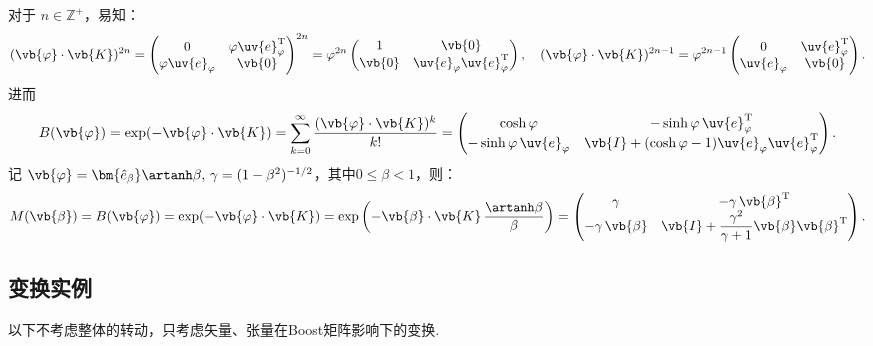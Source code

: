 对于 \(n \in \mathbb{Z}^+\)，易知：
\begin{equation*}
	(\vb{\varphi} \cdot \vb{K})^{2n} = \begin{pmatrix}
		0                      & \varphi \uv{e}_\varphi^\mathrm{T} \\
		\varphi \uv{e}_\varphi & \vb{0}
	\end{pmatrix}^{2n} = \varphi^{2n} \begin{pmatrix}
		1      & \vb{0}                                   \\
		\vb{0} & \uv{e}_\varphi \uv{e}_\varphi^\mathrm{T}
	\end{pmatrix},\quad
	(\vb{\varphi} \cdot \vb{K})^{2n-1} = \varphi^{2n-1} \begin{pmatrix}
		0              & \uv{e}_\varphi^\mathrm{T} \\
		\uv{e}_\varphi & \vb{0}
	\end{pmatrix}.
\end{equation*}
进而
\begin{equation*}
	B(\vb{\varphi}) = \exp(-\vb{\varphi} \cdot \vb{K}) = \sum_{k=0}^\infty \dfrac{(\vb{\varphi} \cdot \vb{K})^k}{k!} = \begin{pmatrix}
		\cosh\varphi                    & -\sinh\varphi \, \uv{e}_\varphi^\mathrm{T}                           \\
		-\sinh\varphi \, \uv{e}_\varphi & \vb{I} + (\cosh\varphi - 1) \uv{e}_\varphi \uv{e}_\varphi^\mathrm{T}
	\end{pmatrix}.
\end{equation*}
记 \(\vb{\varphi} = \bm{\hat{e}_\beta} \artanh\beta,\,\gamma = (1 - \beta^2)^{-1/2}\)，其中\(0 \leq \beta < 1\)，则：
\begin{equation*}
	M(\vb{\beta}) = B(\vb{\varphi}) = \exp(-\vb{\varphi} \cdot \vb{K}) = \exp\left( -\vb{\beta} \cdot \vb{K}\, \dfrac{\artanh\beta}{\beta} \right) = \begin{pmatrix}
		\gamma                & -\gamma \, \vb{\beta}^\mathrm{T}                                       \\
		-\gamma \, \vb{\beta} & \vb{I} + \dfrac{\gamma^2}{\gamma + 1} \vb{\beta} \vb{\beta}^\mathrm{T}
	\end{pmatrix}.
\end{equation*}

\subsection{变换实例}
以下不考虑整体的转动，只考虑矢量、张量在Boost矩阵影响下的变换.
